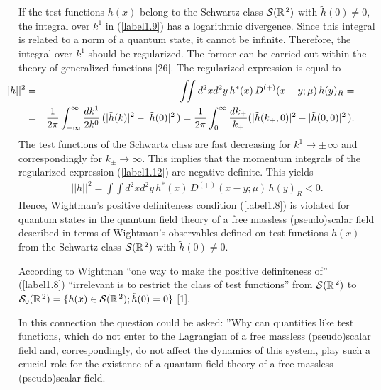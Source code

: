 \documentclass[a4paper,12pt] {article}
\begin{document}
If the test functions $h(x)$ belong to the Schwartz class ${\cal
S}(\mathbb{R}^{\,2})$ with $\tilde{h}(0) \neq 0$, the integral over
$k^1$ in (\ref{label1.9}) has a logarithmic divergence. Since this
integral is related to a norm of a quantum state, it cannot be
infinite. Therefore, the integral over $k^1$ should be
regularized. The former can be carried out within the theory of
generalized functions [26]. The regularized expression is equal to
%
\begin{eqnarray}\label{label1.12}
\hspace{-0.5in}||h||^2 &=& \int\!\!\!\int
d^2xd^2y\,h^*(x)\,D^{(+)}(x-y; \mu)\,h(y)_{R} = \nonumber\\
\hspace{-0.5in}&=&\frac{1}{2\pi}
\int^{\infty}_{-\infty}\frac{dk^1}{2k^0}\,(|\tilde{h}(k)|^2 -
|\tilde{h}(0)|^2\,) = \frac{1}{2\pi}\int^{\infty}_0\frac{dk_+}{k_+}
(|\tilde{h}(k_+, 0)|^2 - |\tilde{h}(0, 0)|^2\,).
\end{eqnarray}
%
The test functions of the Schwartz class are fast decreasing for $k^1
\to \pm\,\infty$ and correspondingly for $k_{\pm} \to \infty$. This
implies that the momentum integrals of the regularized expression
(\ref{label1.12}) are negative definite. This yields
%
\begin{eqnarray}\label{label1.13}
||h||^2 =\int\!\!\!\int d^2xd^2y\,h^*(x)\,D^{(+)}(x-y; \mu)\,h(y)_{R}
< 0.
\end{eqnarray}
%
Hence, Wightman's positive definiteness condition (\ref{label1.8}) is
violated for quantum states in the quantum field theory of a free
massless (pseudo)scalar field described in terms of Wightman's
observables defined on test functions $h(x)$ from the Schwartz class
${\cal S}(\mathbb{R}^{\,2})$ with $\tilde{h}(0) \neq 0$.

According to Wightman ``one way to make the positive definiteness of''
(\ref{label1.8}) ``irrelevant is to restrict the class of test
functions'' from ${\cal S}(\mathbb{R}^{\,2})$ to ${\cal
S}_0(\mathbb{R}^{\,2}) = \{h(x) \in {\cal S}(\mathbb{R}^{\,2});
\tilde{h}(0) = 0\}$ [1].

In this connection the question could be asked: ''Why can quantities
like test functions, which do not enter to the Lagrangian of a free
massless (pseudo)scalar field and, correspondingly, do not affect the
dynamics of this system, play such a crucial role for the existence of
a quantum field theory of a free massless (pseudo)scalar field.
\end{document}
